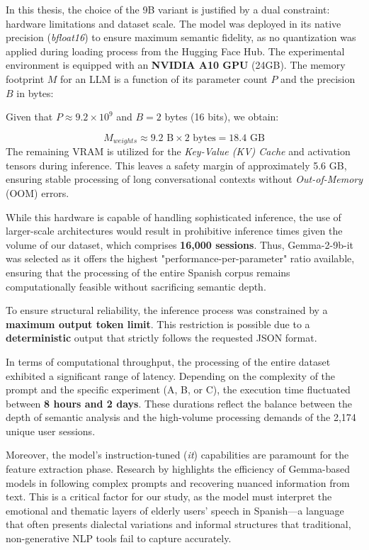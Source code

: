 In this thesis, the choice of the 9B variant is justified by a dual constraint: hardware limitations and dataset scale. The model was deployed in its native precision (\textit{bfloat16}) to ensure maximum semantic fidelity, as no quantization was applied during loading process from the Hugging Face Hub. The experimental environment is equipped with an \textbf{NVIDIA A10 GPU} (24GB). The memory footprint $M$ for an LLM is a function of its parameter count $P$ and the precision $B$ in bytes:

Given that $P \approx 9.2 \times 10^9$ and $B = 2$ bytes (16 bits), we obtain:

\begin{equation}
    M_{weights} \approx 9.2 \text{ B} \times 2 \text{ bytes} = 18.4 \text{ GB}
\end{equation}
The remaining VRAM is utilized for the \textit{Key-Value (KV) Cache} and activation tensors during \gls{inference}. This leaves a safety margin of approximately 5.6 GB, ensuring stable processing of long conversational contexts without \textit{Out-of-Memory} (OOM) errors.

While this hardware is capable of handling sophisticated inference, the use of larger-scale architectures would result in prohibitive inference times given the volume of our dataset, which comprises \textbf{16,000 sessions}. Thus, Gemma-2-9b-it was selected as it offers the highest "performance-per-parameter" ratio available, ensuring that the processing of the entire Spanish corpus remains computationally feasible without sacrificing semantic depth.

To ensure structural reliability, the \gls{inference} process was constrained by a \textbf{maximum output token limit}. This restriction is possible due to a \textbf{deterministic} output that strictly follows the requested JSON format.

In terms of computational throughput, the processing of the entire dataset exhibited a significant range of latency. Depending on the complexity of the prompt and the specific experiment (A, B, or C), the execution time fluctuated between \textbf{8 hours and 2 days}. These durations reflect the balance between the depth of semantic analysis and the high-volume processing demands of the 2,174 unique user sessions.

Moreover, the model's instruction-tuned (\textit{it}) capabilities are paramount for the feature extraction phase. Research by \cite{10796809} highlights the efficiency of Gemma-based models in following complex prompts and recovering nuanced information from text. This is a critical factor for our study, as the model must interpret the emotional and thematic layers of elderly users' speech in Spanish—a language that often presents dialectal variations and informal structures that traditional, non-generative NLP tools fail to capture accurately.



